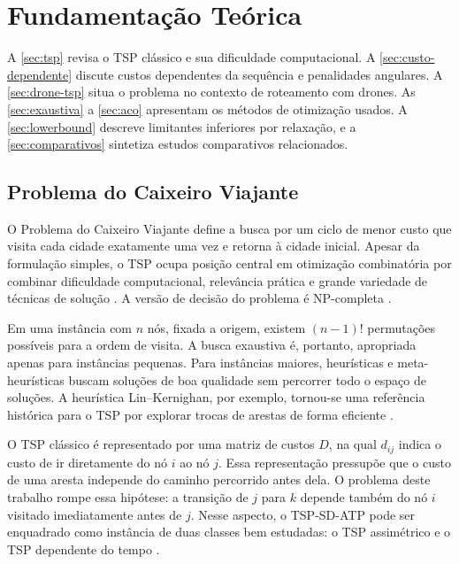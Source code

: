 \chapter[Fundamentação Teórica]{Fundamentação Teórica}
\label{fundamentacao}

A \autoref{sec:tsp} revisa o \ac{TSP} clássico e sua dificuldade computacional. A \autoref{sec:custo-dependente} discute custos dependentes da sequência e penalidades angulares. A \autoref{sec:drone-tsp} situa o problema no contexto de roteamento com drones. As \autoref{sec:exaustiva} a \autoref{sec:aco} apresentam os métodos de otimização usados. A \autoref{sec:lowerbound} descreve limitantes inferiores por relaxação, e a \autoref{sec:comparativos} sintetiza estudos comparativos relacionados.

\section{Problema do Caixeiro Viajante}
\label{sec:tsp}

O Problema do Caixeiro Viajante define a busca por um ciclo de menor custo que visita cada cidade exatamente uma vez e retorna à cidade inicial. Apesar da formulação simples, o \ac{TSP} ocupa posição central em otimização combinatória por combinar dificuldade computacional, relevância prática e grande variedade de técnicas de solução \cite{applegate2006traveling}. A versão de decisão do problema é \ac{NP}-completa \cite{garey1979computers}.

Em uma instância com $n$ nós, fixada a origem, existem $(n-1)!$ permutações possíveis para a ordem de visita. A busca exaustiva é, portanto, apropriada apenas para instâncias pequenas. Para instâncias maiores, heurísticas e meta-heurísticas buscam soluções de boa qualidade sem percorrer todo o espaço de soluções. A heurística Lin--Kernighan, por exemplo, tornou-se uma referência histórica para o \ac{TSP} por explorar trocas de arestas de forma eficiente \cite{lin1973effective}.

O \ac{TSP} clássico é representado por uma matriz de custos $D$, na qual $d_{ij}$ indica o custo de ir diretamente do nó $i$ ao nó $j$. Essa representação pressupõe que o custo de uma aresta independe do caminho percorrido antes dela. O problema deste trabalho rompe essa hipótese: a transição de $j$ para $k$ depende também do nó $i$ visitado imediatamente antes de $j$. Nesse aspecto, o \ac{TSP-SD-ATP} pode ser enquadrado como instância de duas classes bem estudadas: o \ac{TSP} assimétrico \cite{oncan2009comparative} e o \ac{TSP} dependente do tempo \cite{kinable2017hybrid}.

